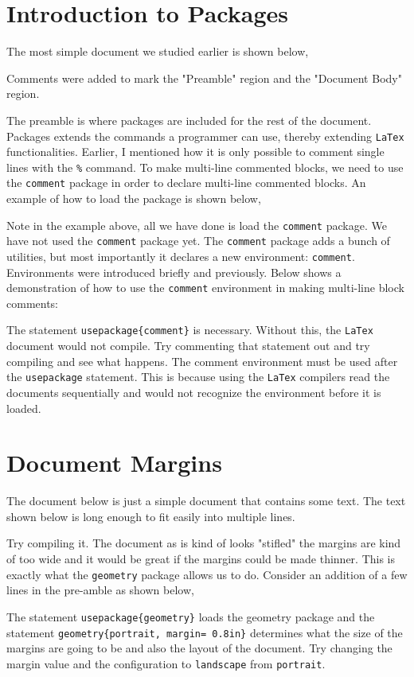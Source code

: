 \documentclass[a4paper, 12pt]{report}
\begin{document}
\begin{center}
\section{Introduction to Packages}
\begin{comment}
\end{comment}
The most simple document we studied earlier is shown below,

Comments were added to mark the "Preamble" region and the "Document Body" region.

The preamble is where packages are included for the rest of the document. Packages extends the commands a programmer can use, thereby extending \texttt{LaTex} functionalities. Earlier, I mentioned how it is only possible to comment single lines with the \texttt{\%} command. To make multi-line commented blocks, we need to use the \texttt{comment} package in order to declare multi-line commented blocks. An example of how to load the package is shown below,

Note in the example above, all we have done is load the \texttt{comment} package. We have not used the \texttt{comment} package yet. The \texttt{comment} package adds a bunch of utilities, but most importantly it declares a new environment: \texttt{comment}. Environments were introduced briefly and previously. Below shows a demonstration of how to use the \texttt{comment} environment in making multi-line block comments:

The statement \texttt{usepackage\{comment\}} is necessary. Without this, the \texttt{LaTex} document would not compile. Try commenting that statement out and try compiling and see what happens. The comment environment must be used after the \texttt{usepackage} statement. This is because using the \texttt{LaTex} compilers read the documents sequentially and would not recognize the environment before it is loaded.

\section{Document Margins}
\begin{comment}
\end{comment}
The document below is just a simple document that contains some text. The text shown below is long enough to fit easily into multiple lines. 

Try compiling it. The document as is kind of looks "stifled" the margins are kind of too wide and it would be great if the margins could be made thinner. This is exactly what the \texttt{geometry} package allows us to do. Consider an addition of a few lines in the pre-amble as shown below,

The statement \texttt{usepackage\{geometry\}} loads the geometry package and the statement \texttt{geometry\{portrait, margin= 0.8in\}} determines what the size of the margins are going to be and also the layout of the document. Try changing the margin value and the configuration to \texttt{landscape} from \texttt{portrait}. 


\end{center}
\end{document}
